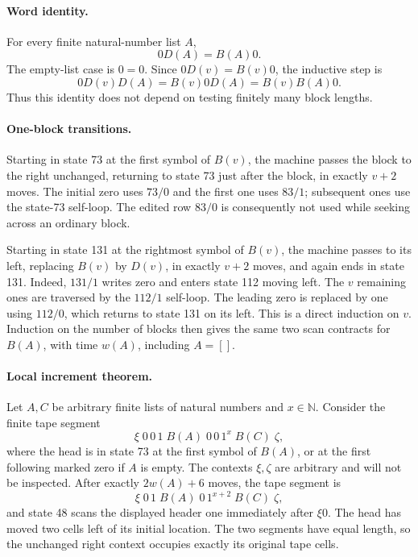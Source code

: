 \paragraph{Word identity.}
For every finite natural-number list $A$,
\begin{equation}
 0D(A)=B(A)0.\label{eq:left-increment-word}
\end{equation}
The empty-list case is $0=0$.  Since $0D(v)=B(v)0$, the inductive step is
\[
 0D(v)D(A)=B(v)0D(A)=B(v)B(A)0.
\]
Thus this identity does not depend on testing finitely many block lengths.

\paragraph{One-block transitions.}
Starting in state 73 at the first symbol of $B(v)$, the machine passes the
block to the right unchanged, returning to state 73 just after the block,
in exactly $v+2$ moves.  The initial zero uses $73/0$ and the first one
uses $83/1$; subsequent ones use the state-73 self-loop.  The edited row
$83/0$ is consequently not used while seeking across an ordinary block.

Starting in state 131 at the rightmost symbol of $B(v)$, the machine
passes to its left, replacing $B(v)$ by $D(v)$, in exactly $v+2$ moves,
and again ends in state 131.  Indeed, $131/1$ writes zero and enters
state 112 moving left.  The $v$ remaining ones are traversed by the
$112/1$ self-loop.  The leading zero is replaced by one using $112/0$,
which returns to state 131 on its left.  This is a direct induction on
$v$.  Induction on the number of blocks then gives the same two scan
contracts for $B(A)$, with time $w(A)$, including $A=[]$.

\paragraph{Local increment theorem.}
Let $A,C$ be arbitrary finite lists of natural numbers and $x\in\mathbb N$.
Consider the finite tape segment
\begin{equation}
 \xi\;0\,0\,1\; B(A)\;0\,0\,1^x\;B(C)\;\zeta,
 \label{eq:left-increment-input}
\end{equation}
where the head is in state 73 at the first symbol of $B(A)$, or at the
first following marked zero if $A$ is empty.  The contexts $\xi,\zeta$
are arbitrary and will not be inspected.  After exactly $2w(A)+6$ moves,
the tape segment is
\begin{equation}
 \xi\;0\,1\; B(A)\;0\,1^{x+2}\;B(C)\;\zeta,
 \label{eq:left-increment-output}
\end{equation}
and state 48 scans the displayed header one immediately after $\xi0$.
The head has moved two cells left of its initial location.  The two
segments have equal length, so the unchanged right context occupies
exactly its original tape cells.


